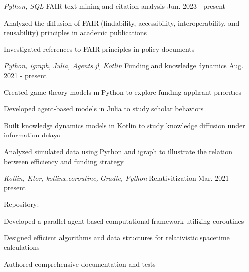 

\begin{cventries}

  \cventry
    {\emph{Python, SQL}} %
    {FAIR text-mining and citation analysis} %
    {} %
    {Jun. 2023 - present} %
    {
      \begin{cvitems} %
        \item{Analyzed the diffusion of FAIR (findability, accessibility, interoperability, and reusability) principles in academic publications}
        \item{Investigated references to FAIR principles in policy documents}
      \end{cvitems}
    }

  \cventry
    {\emph{Python, igraph, Julia, Agents.jl, Kotlin}} %
    {Funding and knowledge dynamics} %
    {} %
    {Aug. 2021 - present} %
    {
      \begin{cvitems} %
        \item{Created game theory models in Python to explore funding applicant priorities}
        \item{Developed agent-based models in Julia to study scholar behaviors}
        \item{Built knowledge dynamics models in Kotlin to study knowledge diffusion under information delays}
        \item{Analyzed simulated data using Python and igraph to illustrate the relation between efficiency and funding strategy}
      \end{cvitems}
    }

  \cventry
    {\emph{Kotlin, Ktor, kotlinx.coroutine, Gradle, Python}} %
    {Relativitization} %
    {} %
    {Mar. 2021 - present} %
    {
      \begin{cvitems} %
        \item{Repository: \href{https://github.com/adriankhl/relativitization}{\underline{}}}
        \item{Developed a parallel agent-based computational framework utilizing coroutines}
        \item{Designed efficient algorithms and data structures for relativistic spacetime calculations}
        \item{Authored comprehensive documentation and tests}
      \end{cvitems}
    }


\end{cventries}

